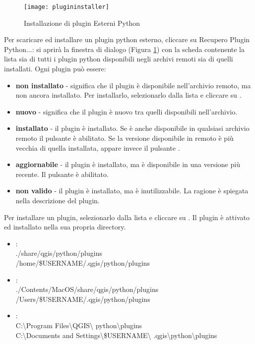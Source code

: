 \begin{figure}[ht]
   \centering
   \texttt{[image: plugininstaller]}
   \caption{Installazione di plugin Esterni Python \nixcaption}\label{fig:plugininstaller}\smallskip
\end{figure}

Per scaricare ed installare un plugin python esterno, cliccare su  \arrow {}
{Recupero Plugin Python...}: si aprirà la finestra di dialogo  
(Figura \ref{fig:plugininstaller}) con la scheda  contenente la lista sia di tutti i plugin python 
disponibili negli archivi remoti sia di quelli installati. Ogni plugin può essere:
\begin{itemize}
\item \textbf{non installato} - significa che il plugin è disponibile nell'archivio remoto, ma non ancora installato. 
Per installarlo, selezionarlo dalla lista e cliccare su  .
\item \textbf{nuovo} - significa che il plugin è nuovo tra quelli disponibili nell'archivio.
\item \textbf{installato} - il plugin è installato. Se è anche disponibile in qualsiasi archivio remoto il pulsante 
 è abilitato. Se la versione disponibile in remoto è più vecchia di quella installata, 
appare invece il pulsante .
\item \textbf{aggiornabile} - il plugin è installato, ma è disponibile in una versione più recente. 
Il pulsante  è abilitato.
\item \textbf{non valido} - il plugin è installato, ma è inutilizzabile. La ragione è spiegata nella descrizione del plugin.
\end{itemize}


Per installare un plugin, selezionarlo dalla lista e cliccare su . Il plugin è attivato ed 
installato nella sua propria directory.

\begin{itemize}[label=--]
\item {}:\\
./share/qgis/python/plugins \\
/home/\$USERNAME/.qgis/python/plugins
\item {}:\\
./Contents/MacOS/share/qgis/python/plugins \\
/Users/\$USERNAME/.qgis/python/plugins
\item {}:\\
C:\textbackslash Program Files\textbackslash QGIS\textbackslash
python\textbackslash plugins \\
C:\textbackslash Documents and Settings\textbackslash\$USERNAME\textbackslash
.qgis\textbackslash python\textbackslash plugins
\end{itemize}

